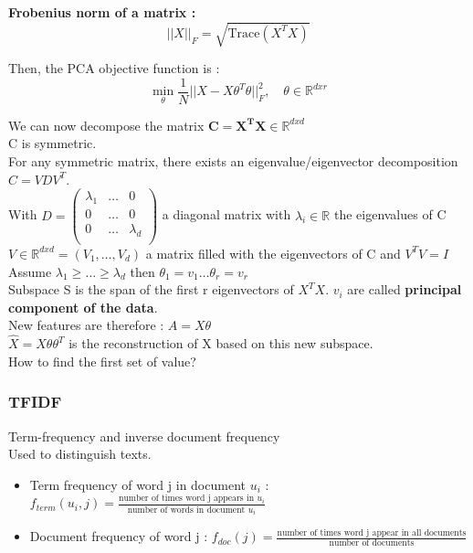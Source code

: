 \documentclass[../main.tex]{subfiles}
\begin{document}
\textbf{Frobenius norm of a matrix :} \begin{equation}
    \lvert \lvert X\rvert \rvert_F = \sqrt{\text{Trace}(X^TX)}
\end{equation}

Then, the PCA objective function is : \begin{equation}
    \min_\theta \frac{1}{N} \lvert \lvert X-X\theta^T\theta\rvert \rvert_F^2, \quad \theta \in \mathbb{R}^{dxr}
\end{equation}

We can now decompose the matrix $\mathbf{C = X^TX} \in \mathbb{R}^{dxd}$\\
C is symmetric. \\
For any symmetric matrix, there exists an eigenvalue/eigenvector decomposition $C = VDV^T$.\\
With $D = \begin{pmatrix}
    \lambda_1 & \dots & 0\\
    0 & \dots & 0\\
    0 & \dots & \lambda_d\\
\end{pmatrix}$ a diagonal matrix with $\lambda_i \in \mathbb{R}$ the eigenvalues of C\\
$V\in \mathbb{R}^{dxd} = (V_1,\dots, V_d)$ a matrix filled with the eigenvectors of C and $V^TV = I$\\

Assume $\lambda_1 \geq \dots \geq \lambda_d$ then $\theta_1 = v_1 \dots \theta_r = v_r$\\
Subspace S is the span of the first r eigenvectors of $X^TX$. $v_i$ are called \textbf{principal component of the data}. \\
New features are therefore : $A = X\theta$\\
$\hat{X} = X\theta\theta^T$ is the reconstruction of X based on this new subspace.\\

How to find the first set of value? \\
\subsubsection{TFIDF}
Term-frequency and inverse document frequency\\
Used to distinguish texts.\\

\begin{itemize}
    \item Term frequency of word j in document $u_i$ : $f_{term}(u_i,j) = \frac{\text{number of times word j appears in }u_i}{\text{number of words in document }u_i}$\\
    \item Document frequency of word j : $f_{doc}(j) = \frac{\text{number of times word j appear in all documents}}{\text{number of documents}}$\\
\end{itemize}
\end{document}
